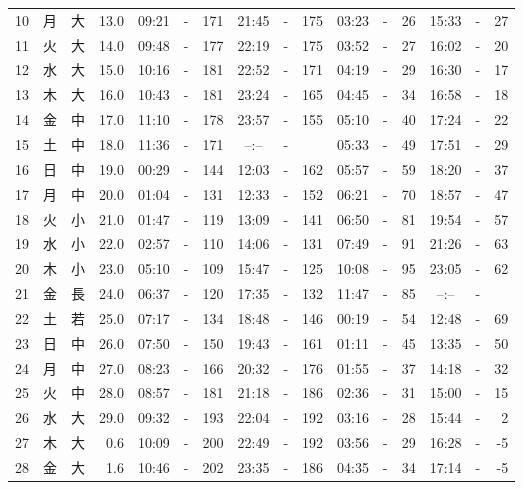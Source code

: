 \documentclass[12pt.a4j]{jsarticle}
\begin{document}
\begin{center}
\begin{table}[ht]
\begin{tabular}{|rc|cr|ccrccr|ccrccr|}
10 & 月 & 大 & 13.0 &  09:21 &-& 171  &  21:45 &-& 175  &   03:23 &-&  26  &   15:33 &-&  27  \\
11 & 火 & 大 & 14.0 &  09:48 &-& 177  &  22:19 &-& 175  &   03:52 &-&  27  &   16:02 &-&  20  \\
12 & 水 & 大 & 15.0 &  10:16 &-& 181  &  22:52 &-& 171  &   04:19 &-&  29  &   16:30 &-&  17  \\
13 & 木 & 大 & 16.0 &  10:43 &-& 181  &  23:24 &-& 165  &   04:45 &-&  34  &   16:58 &-&  18  \\
14 & 金 & 中 & 17.0 &  11:10 &-& 178  &  23:57 &-& 155  &   05:10 &-&  40  &   17:24 &-&  22  \\
15 & 土 & 中 & 18.0 &  11:36 &-& 171  &  --:-- &-&     &   05:33 &-&  49  &   17:51 &-&  29  \\
16 & 日 & 中 & 19.0 &  00:29 &-& 144  &  12:03 &-& 162  &   05:57 &-&  59  &   18:20 &-&  37  \\
17 & 月 & 中 & 20.0 &  01:04 &-& 131  &  12:33 &-& 152  &   06:21 &-&  70  &   18:57 &-&  47  \\
18 & 火 & 小 & 21.0 &  01:47 &-& 119  &  13:09 &-& 141  &   06:50 &-&  81  &   19:54 &-&  57  \\
19 & 水 & 小 & 22.0 &  02:57 &-& 110  &  14:06 &-& 131  &   07:49 &-&  91  &   21:26 &-&  63  \\
20 & 木 & 小 & 23.0 &  05:10 &-& 109  &  15:47 &-& 125  &   10:08 &-&  95  &   23:05 &-&  62  \\
21 & 金 & 長 & 24.0 &  06:37 &-& 120  &  17:35 &-& 132  &   11:47 &-&  85  &   --:-- &-&     \\
22 & 土 & 若 & 25.0 &  07:17 &-& 134  &  18:48 &-& 146  &   00:19 &-&  54  &   12:48 &-&  69  \\
23 & 日 & 中 & 26.0 &  07:50 &-& 150  &  19:43 &-& 161  &   01:11 &-&  45  &   13:35 &-&  50  \\
24 & 月 & 中 & 27.0 &  08:23 &-& 166  &  20:32 &-& 176  &   01:55 &-&  37  &   14:18 &-&  32  \\
25 & 火 & 中 & 28.0 &  08:57 &-& 181  &  21:18 &-& 186  &   02:36 &-&  31  &   15:00 &-&  15  \\
26 & 水 & 大 & 29.0 &  09:32 &-& 193  &  22:04 &-& 192  &   03:16 &-&  28  &   15:44 &-&   2  \\
27 & 木 & 大 &  0.6 &  10:09 &-& 200  &  22:49 &-& 192  &   03:56 &-&  29  &   16:28 &-&  -5  \\
28 & 金 & 大 &  1.6 &  10:46 &-& 202  &  23:35 &-& 186  &   04:35 &-&  34  &   17:14 &-&  -5  \\

\end{tabular}
\end{table}
\end{center}
\end{document}
